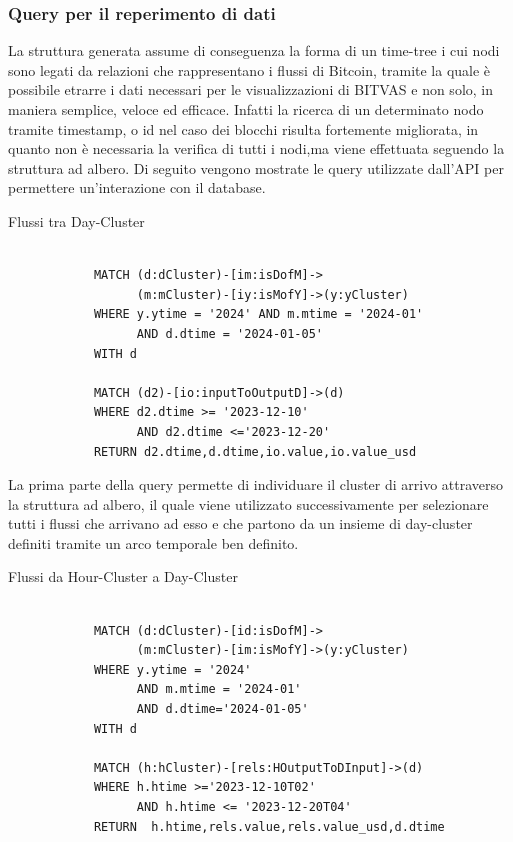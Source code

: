 \subsubsection{Query per il reperimento di dati}
La struttura generata assume di conseguenza la forma di un time-tree i cui nodi sono legati da relazioni che rappresentano i flussi di Bitcoin, tramite la quale è possibile etrarre i dati necessari per le visualizzazioni di BITVAS e non solo, in maniera semplice, veloce ed efficace.
Infatti la ricerca di un determinato nodo tramite timestamp, o id nel caso dei blocchi risulta fortemente migliorata, in quanto non è necessaria la verifica di tutti i nodi,ma viene effettuata seguendo la struttura ad albero. 
Di seguito vengono mostrate le query utilizzate dall'API per permettere un'interazione con il database.

\newpage \thispagestyle{mystyle}

\begin{center}
Flussi tra Day-Cluster
\begin{lstlisting}

            MATCH (d:dCluster)-[im:isDofM]->
                  (m:mCluster)-[iy:isMofY]->(y:yCluster)
            WHERE y.ytime = '2024' AND m.mtime = '2024-01'
                  AND d.dtime = '2024-01-05'
            WITH d

            MATCH (d2)-[io:inputToOutputD]->(d)
            WHERE d2.dtime >= '2023-12-10' 
                  AND d2.dtime <='2023-12-20' 
            RETURN d2.dtime,d.dtime,io.value,io.value_usd
\end{lstlisting} 
\end{center}

La prima parte della query permette di individuare il cluster di arrivo attraverso la struttura ad albero, il quale viene utilizzato successivamente per selezionare tutti i flussi che arrivano ad esso e che partono da un insieme di day-cluster definiti tramite un arco temporale ben definito.

\vspace{5mm}
\begin{center}
Flussi da Hour-Cluster a Day-Cluster 
\begin{lstlisting}

            MATCH (d:dCluster)-[id:isDofM]->
                  (m:mCluster)-[im:isMofY]->(y:yCluster)
            WHERE y.ytime = '2024' 
                  AND m.mtime = '2024-01' 
                  AND d.dtime='2024-01-05'
            WITH d

            MATCH (h:hCluster)-[rels:HOutputToDInput]->(d)
            WHERE h.htime >='2023-12-10T02' 
                  AND h.htime <= '2023-12-20T04' 
            RETURN  h.htime,rels.value,rels.value_usd,d.dtime
\end{lstlisting} 
\end{center}

